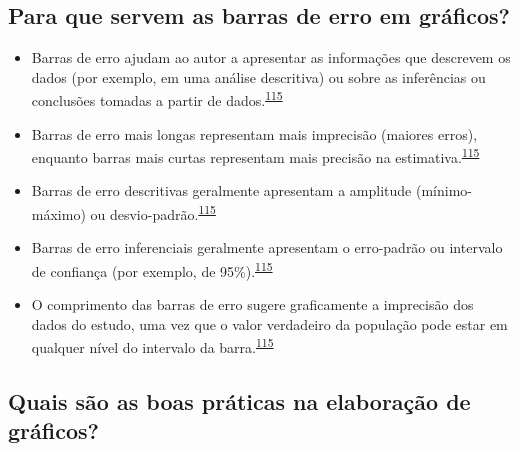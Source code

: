 \documentclass[
  a4paper,
]{book}
\begin{document}
\hypertarget{para-que-servem-as-barras-de-erro-em-gruxe1ficos}{%
\subsection{Para que servem as barras de erro em gráficos?}\label{para-que-servem-as-barras-de-erro-em-gruxe1ficos}}

\begin{itemize}
\item
  Barras de erro ajudam ao autor a apresentar as informações que descrevem os dados (por exemplo, em uma análise descritiva) ou sobre as inferências ou conclusões tomadas a partir de dados.\textsuperscript{\protect\hyperlink{ref-Cumming2007}{115}}
\item
  Barras de erro mais longas representam mais imprecisão (maiores erros), enquanto barras mais curtas representam mais precisão na estimativa.\textsuperscript{\protect\hyperlink{ref-Cumming2007}{115}}
\item
  Barras de erro descritivas geralmente apresentam a amplitude (mínimo-máximo) ou desvio-padrão.\textsuperscript{\protect\hyperlink{ref-Cumming2007}{115}}
\item
  Barras de erro inferenciais geralmente apresentam o erro-padrão ou intervalo de confiança (por exemplo, de 95\%).\textsuperscript{\protect\hyperlink{ref-Cumming2007}{115}}
\item
  O comprimento das barras de erro sugere graficamente a imprecisão dos dados do estudo, uma vez que o valor verdadeiro da população pode estar em qualquer nível do intervalo da barra.\textsuperscript{\protect\hyperlink{ref-Cumming2007}{115}}
\end{itemize}

\hypertarget{quais-suxe3o-as-boas-pruxe1ticas-na-elaborauxe7uxe3o-de-gruxe1ficos}{%
\subsection{Quais são as boas práticas na elaboração de gráficos?}\label{quais-suxe3o-as-boas-pruxe1ticas-na-elaborauxe7uxe3o-de-gruxe1ficos}}
\end{document}
